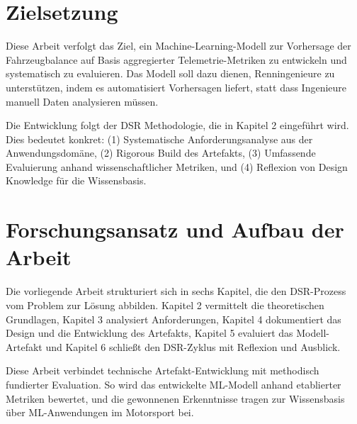 \section{Zielsetzung}

Diese Arbeit verfolgt das Ziel, ein Machine-Learning-Modell zur Vorhersage der Fahrzeugbalance auf Basis aggregierter Telemetrie-Metriken zu entwickeln und systematisch zu evaluieren. Das Modell soll dazu dienen, Renningenieure zu unterstützen, indem es automatisiert Vorhersagen liefert, statt dass Ingenieure manuell Daten analysieren müssen.

Die Entwicklung folgt der \ac{DSR} Methodologie, die in Kapitel 2 eingeführt wird. Dies bedeutet konkret: (1) Systematische Anforderungsanalyse aus der Anwendungsdomäne, (2) Rigorous Build des Artefakts, (3) Umfassende Evaluierung anhand wissenschaftlicher Metriken, und (4) Reflexion von Design Knowledge für die Wissensbasis.

\section{Forschungsansatz und Aufbau der Arbeit}

Die vorliegende Arbeit strukturiert sich in sechs Kapitel, die den DSR-Prozess vom Problem zur Lösung abbilden. Kapitel 2 vermittelt die theoretischen Grundlagen, Kapitel 3 analysiert Anforderungen, Kapitel 4 dokumentiert das Design und die Entwicklung des Artefakts, Kapitel 5 evaluiert das Modell-Artefakt und Kapitel 6 schließt den DSR-Zyklus mit Reflexion und Ausblick.

Diese Arbeit verbindet technische Artefakt-Entwicklung mit methodisch fundierter 
Evaluation. So wird das entwickelte ML-Modell anhand etablierter Metriken bewertet, 
und die gewonnenen Erkenntnisse tragen zur Wissensbasis über ML-Anwendungen im 
Motorsport bei.